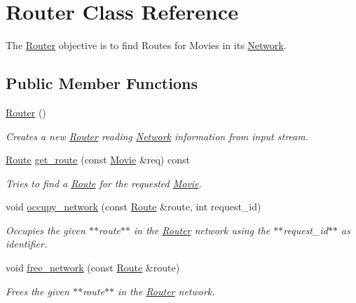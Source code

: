 \hypertarget{class_router}{
\section{Router Class Reference}
\label{class_router}
}


The \hyperlink{class_router}{Router} objective is to find Routes for Movies in its \hyperlink{class_network}{Network}.  


\subsection*{Public Member Functions}
\begin{DoxyCompactItemize}
\item 
\hyperlink{class_router_a555428efbf07e22776889b8d9b88027f}{Router} ()
\begin{DoxyCompactList}\small\item\em Creates a new \hyperlink{class_router}{Router} reading \hyperlink{class_network}{Network} information from input stream. \item\end{DoxyCompactList}\item 
\hyperlink{class_route}{Route} \hyperlink{class_router_a657111f5b8336eb495cbc349dd5b9bb7}{get\_\-route} (const \hyperlink{class_movie}{Movie} \&req) const 
\begin{DoxyCompactList}\small\item\em Tries to find a \hyperlink{class_route}{Route} for the requested \hyperlink{class_movie}{Movie}. \item\end{DoxyCompactList}\item 
void \hyperlink{class_router_affcb472eab1ef1ce4acf51f8bf8cf1bc}{occupy\_\-network} (const \hyperlink{class_route}{Route} \&route, int request\_\-id)
\begin{DoxyCompactList}\small\item\em Occupies the given $\ast$$\ast$route$\ast$$\ast$ in the \hyperlink{class_router}{Router} network using the $\ast$$\ast$request\_\-id$\ast$$\ast$ as identifier. \item\end{DoxyCompactList}\item 
void \hyperlink{class_router_af03c1d5e3a64c1176e7c65f2d6bc0342}{free\_\-network} (const \hyperlink{class_route}{Route} \&route)
\begin{DoxyCompactList}\small\item\em Frees the given $\ast$$\ast$route$\ast$$\ast$ in the \hyperlink{class_router}{Router} network. \item\end{DoxyCompactList}\end{DoxyCompactItemize}


